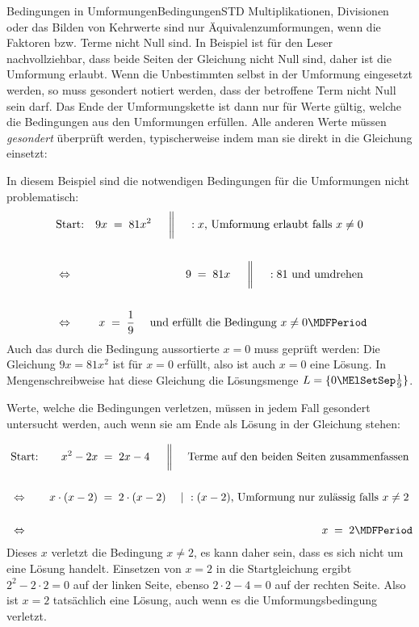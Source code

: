 \begin{MXContent}{Bedingungen in Umformungen}{Bedingungen}{STD}
Multiplikationen, Divisionen oder das Bilden von Kehrwerte sind nur Äquivalenzumformungen, wenn die Faktoren bzw. Terme nicht Null sind. In Beispiel  ist für den Leser nachvollziehbar, dass beide %
Seiten der Gleichung nicht Null sind, daher ist die Umformung erlaubt. Wenn die Unbestimmten selbst in der Umformung eingesetzt werden,
so muss gesondert notiert werden, dass der betroffene Term nicht Null sein darf. Das Ende der Umformungskette ist dann nur für Werte gültig, welche die Bedingungen aus den Umformungen erfüllen.
Alle anderen Werte müssen \textit{gesondert} überprüft werden, typischerweise indem man sie direkt in die Gleichung einsetzt:

\begin{MExample}
In diesem Beispiel sind die notwendigen Bedingungen für die Umformungen nicht problematisch:
\begin{eqnarray*}
& \text{Start:} & 9x \;=\;81x^2  \ \ \ \ \MSep \ :x\text{, Umformung erlaubt falls }x\not=0\ \\ \ \\
& \Leftrightarrow & 9 \;=\; 81x  \ \ \ \ \MSep \ :81\text{ und umdrehen}\ \\ \ \\
& \Leftrightarrow & x \;=\; \Mdfrac19 \ \ \ \ \text{und erfüllt die Bedingung }x\not=0 \MDFPeriod
\end{eqnarray*}
Auch das durch die Bedingung aussortierte $x=0$ muss geprüft werden: Die Gleichung $9x=81x^2$ ist für $x=0$ erfüllt, also ist auch $x=0$ eine Lösung.
In Mengenschreibweise hat diese Gleichung die Lösungsmenge $\ML=\lbrace 0\MElSetSep \Mtfrac19\rbrace$.
\end{MExample}

Werte, welche die Bedingungen verletzen, müssen in jedem Fall gesondert untersucht werden, auch wenn sie am Ende als Lösung in der Gleichung stehen: %

\begin{MExample}
\begin{eqnarray*}
& \text{Start:} & x^2-2x \;=\; 2x-4 \ \ \ \ \MSep \ \text{Terme auf den beiden Seiten zusammenfassen} \ \\ \ \\
& \Leftrightarrow & x\cdot (x-2) \;=\; 2\cdot (x-2) \ \ \ \ | \ :(x-2)\text{, Umformung nur zulässig falls }x\not=2\ \\ \ \\
& \Leftrightarrow & x\;=\; 2  \MDFPeriod
\end{eqnarray*}
Dieses $x$ verletzt die Bedingung $x\not=2$, es kann daher sein, dass es sich nicht um eine Lösung handelt.
Einsetzen von $x=2$ in die Startgleichung ergibt $2^2-2\cdot 2=0$ auf der linken Seite, ebenso $2\cdot 2-4=0$ auf der rechten Seite. Also ist $x=2$ tatsächlich eine Lösung,
auch wenn es die Umformungsbedingung verletzt.
\end{MExample}


\end{MXContent}
